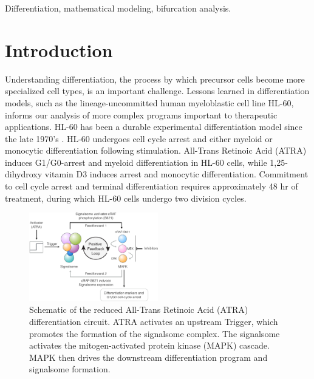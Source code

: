 \documentclass[10pt,twocolumn,twoside,final]{IEEEtran}
\begin{document}
\begin{IEEEkeywords}
Differentiation, mathematical modeling, bifurcation analysis.
\end{IEEEkeywords}


\section{Introduction}
Understanding differentiation,
the process by which precursor cells become more specialized cell types, is an important challenge.
Lessons learned in differentiation models, such as the lineage-uncommitted human myeloblastic cell line HL-60,
informs our analysis of more complex programs important to therapeutic applications.
HL-60 has been a durable experimental differentiation model since the late 1970's \cite{Breitman1980}.
HL-60 undergoes cell cycle arrest and either myeloid or monocytic differentiation following stimulation.
All-Trans Retinoic Acid (ATRA) induces G1/G0-arrest and myeloid differentiation in HL-60 cells,
while 1,25-dihydroxy vitamin D3 induces arrest and monocytic differentiation.
Commitment to cell cycle arrest and terminal differentiation requires approximately 48 hr of treatment,
during which HL-60 cells undergo two division cycles.

\begin{figure}[!t]
\includegraphics[width=0.5\textwidth]{./figs/Fig-1-Network.pdf}
\caption{Schematic of the reduced All-Trans Retinoic Acid (ATRA) differentiation circuit.
ATRA activates an upstream Trigger, which promotes the formation of the signalsome complex.
The signalsome activates the mitogen-activated protein kinase (MAPK) cascade.
MAPK then drives the downstream differentiation program and signalsome formation.}\label{fig:network}
\end{figure}
\end{document}
